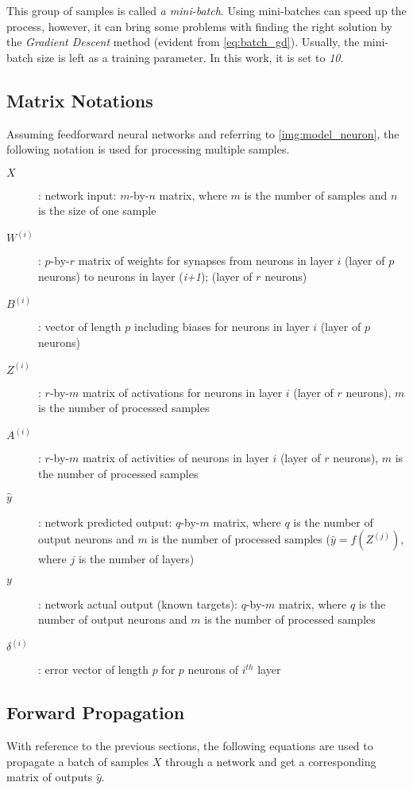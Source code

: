 This group of samples is called \textit{a mini-batch}. Using mini-batches can speed up the process, however, it can bring some problems with finding the right solution by the \textit{Gradient Descent} method (evident from \cref{eq:batch_gd}). Usually, the mini-batch size is left as a training parameter. In this work, it is set to \textit{10}.

\subsection{Matrix Notations} \label{ssec:matrix_notation}
Assuming feedforward neural networks and referring to \cref{img:model_neuron}, the following notation is used for processing multiple samples.

\begin{description}
\item[$ X $] : network input: $ m $-by-$ n $ matrix, where $ m $ is the number of samples and $ n $ is the size of one sample
\item[$ W^{(i)} $] : $ p $-by-$ r $ matrix of weights for synapses from neurons in layer $ i $ (layer of $ p $ neurons) to neurons in layer (\textit{i+1}); (layer of $ r $ neurons)
\item[$ B^{(i)} $] : vector of length $ p $ including biases for neurons in layer $ i $ (layer of $ p $ neurons)
\item[$ Z^{(i)} $] : $ r $-by-$ m $ matrix of activations for neurons in layer $ i $ (layer of $ r $ neurons), $ m $ is the number of processed samples
\item[$ A^{(i)} $] : $ r $-by-$ m $ matrix of activities of neurons in layer $ i $ (layer of $ r $ neurons), $ m $ is the number of processed samples
\item[$ \hat{y} $] : network predicted output: $ q $-by-$ m $ matrix, where $ q $ is the number of output neurons and $ m $ is the number of processed samples ($ \hat{y} = f(Z^{(j)}) $, where $ j $ is the number of layers)
\item[$ y $] : network actual output (known targets): $ q $-by-$ m $ matrix, where $ q $ is the number of output neurons and $ m $ is the number of processed samples
\item[$ \delta^{(i)} $] : error vector of length $ p $ for $ p $ neurons of $ i^{th} $ layer
\end{description}

\subsection{Forward Propagation} \label{ssec:forward_propagation}
With reference to the previous sections, the following equations are used to propagate a batch of samples $ X $ through a network and get a corresponding matrix of outputs $ \hat{y} $.


